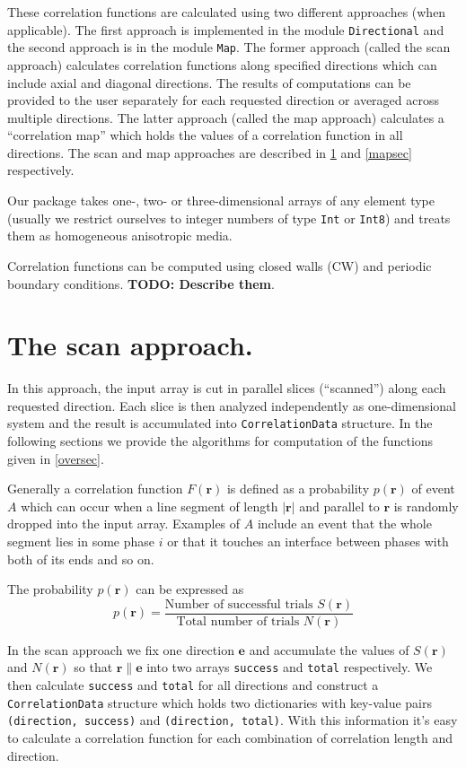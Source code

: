 \documentclass[reprint,amsmath,amssymb,aps,pre]{revtex4-1}
\newcommand{\code}[1]{\colorbox{light-gray}{\texttt{#1}}}
\begin{document}
These correlation functions are calculated using two different approaches (when
applicable). The first approach is implemented in the module \code{Directional}
and the second approach is in the module \code{Map}. The former approach (called
the scan approach) calculates correlation functions along specified directions
which can include axial and diagonal directions. The results of computations can
be provided to the user separately for each requested direction or averaged
across multiple directions. The latter approach (called the map approach)
calculates a ``correlation map'' which holds the values of a correlation
function in all directions. The scan and map approaches are described in
\cref{scansec} and \cref{mapsec} respectively.

Our package takes one-, two- or three-dimensional arrays of any element type
(usually we restrict ourselves to integer numbers of type \code{Int} or
\code{Int8}) and treats them as homogeneous anisotropic media.

Correlation functions can be computed using closed walls (CW) and periodic
boundary conditions. \textbf{TODO: Describe them}.

\section{The scan approach.}
\label{scansec}
In this approach, the input array is cut in parallel slices (``scanned'') along
each requested direction. Each slice is then analyzed independently as
one-dimensional system and the result is accumulated into \code{CorrelationData}
structure. In the following sections we provide the algorithms for computation
of the functions given in \cref{oversec}.

Generally a correlation function $F(\bm{r})$ is defined as a probability
$p(\bm{r})$ of event $A$ which can occur when a line segment of length
$|\bm{r}|$ and parallel to $\bm{r}$ is randomly dropped into the input
array. Examples of $A$ include an event that the whole segment lies in some
phase $i$ or that it touches an interface between phases with both of its ends
and so on.

The probability $p(\bm{r})$ can be expressed as
\begin{equation*}
  p(\bm{r}) = \frac{\text{Number of successful trials $S(\bm{r})$}}
  {\text{Total number of trials $N(\bm{r})$}}
\end{equation*}

In the scan approach we fix one direction $\bm{e}$ and accumulate the values of
$S(\bm{r})$ and $N(\bm{r})$ so that $\bm{r} \parallel \bm{e}$ into two arrays
\code{success} and \code{total} respectively. We then calculate \code{success}
and \code{total} for all directions and construct a \code{CorrelationData}
structure which holds two dictionaries with key-value pairs
\code{(direction, success)} and \code{(direction, total)}. With this information
it's easy to calculate a correlation function for each combination of
correlation length and direction.
\end{document}

